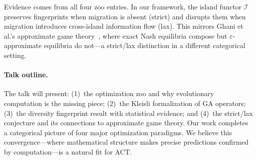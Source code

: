 \documentclass[submission,copyright,creativecommons]{eptcs}
\begin{document}
\noindent
Evidence comes from all four zoo entries. In our framework, the island
functor $\mathcal{I}$ preserves fingerprints when migration is absent
(strict) and disrupts them when migration introduces cross-island
information flow (lax). This mirrors Ghani et al.'s approximate game
theory~\cite{ghani2025approximate}, where exact Nash equilibria compose
but $\varepsilon$-approximate equilibria do not---a strict/lax
distinction in a different categorical setting.

\paragraph{Talk outline.}
The talk will present: (1)~the optimization zoo and why evolutionary
computation is the missing piece; (2)~the Kleisli formalization of GA
operators; (3)~the diversity fingerprint result with statistical
evidence; and (4)~the strict/lax conjecture and its connections to
approximate game theory. Our work completes a categorical picture of four
major optimization paradigms. We believe this convergence---where
mathematical structure makes precise predictions confirmed by
computation---is a natural fit for ACT.



\end{document}
